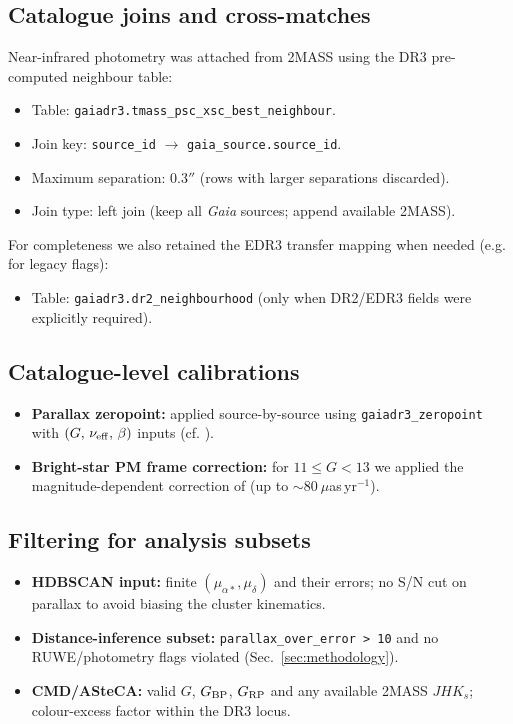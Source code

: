 \documentclass[../main.tex]{subfiles}
\begin{document}
\subsection{Catalogue joins and cross-matches}
\label{app:data:xmatch}
Near-infrared photometry was attached from 2MASS using the DR3 pre-computed neighbour table:
\begin{itemize}
  \item Table: \verb|gaiadr3.tmass_psc_xsc_best_neighbour|.
  \item Join key: \verb|source_id| $\rightarrow$ \verb|gaia_source.source_id|.
  \item Maximum separation: $0.3''$ (rows with larger separations discarded).
  \item Join type: left join (keep all \textit{Gaia} sources; append available 2MASS).
\end{itemize}

For completeness we also retained the EDR3 transfer mapping when needed (e.g. for legacy flags):
\begin{itemize}
  \item Table: \verb|gaiadr3.dr2_neighbourhood| (only when DR2/EDR3 fields were explicitly required).
\end{itemize}

\subsection{Catalogue-level calibrations}
\label{app:data:cals}
\begin{itemize}
  \item \textbf{Parallax zeropoint:} applied source-by-source using \texttt{gaiadr3\_zeropoint} with $(G,\,\nu_{\rm eff},\,\beta)$ inputs (cf. \citealt{2021A&A...649A...2L}).
  \item \textbf{Bright-star PM frame correction:} for $11\le G < 13$ we applied the magnitude-dependent correction of \cite{2021A&A...649A.124C} (up to $\sim 80~\mu$as\,yr$^{-1}$).
\end{itemize}

\subsection{Filtering for analysis subsets}
\label{app:data:subsets}
\begin{itemize}
  \item \textbf{HDBSCAN input:} finite $(\mu_{\alpha*},\mu_\delta)$ and their errors; no S/N cut on parallax to avoid biasing the cluster kinematics.
  \item \textbf{Distance-inference subset:} \verb|parallax_over_error > 10| and no RUWE/photometry flags violated (Sec.~\ref{sec:methodology}).
  \item \textbf{CMD/ASteCA:} valid $G$, $G_{\rm BP}$, $G_{\rm RP}$ and any available 2MASS $JHK_s$; colour-excess factor within the DR3 locus.
\end{itemize}
\end{document}
